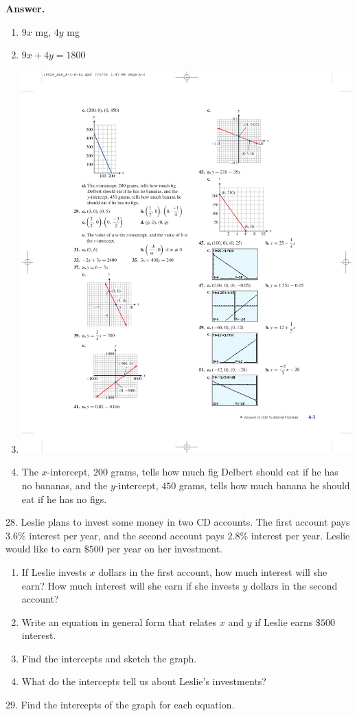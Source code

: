 \documentclass[10pt,]{book}
\theoremstyle{plain}
\theoremstyle{definition}
\theoremstyle{definition}
\theoremstyle{definition}
\numberwithin{equation}{part}
\begin{document}
\begin{exerciselist}
\par\smallskip
\noindent\textbf{Answer.}\hypertarget{answer-21}{}\quad
\leavevmode%
\begin{enumerate}[label=*\alph**]
\item\hypertarget{li-195}{}\(9x\) mg, \(4y\) mg%
\item\hypertarget{li-196}{}\(9x + 4y = 1800\)%
\item\hypertarget{li-197}{}\includegraphics[width=0.35\linewidth]{images/fig-ans-1-1-27}
%
\item\hypertarget{li-198}{}The \(x\)-intercept, \(200\) grams, tells how much fig Delbert should eat if he has no bananas, and the \(y\)-intercept, \(450\) grams, tells how much banana he should eat if he has no figs.%
\end{enumerate}
%
\item[28.]\hypertarget{exercise-35}{}Leslie plans to invest some money in two CD accounts. The first account pays \(3.6\%\) interest per year, and the second account pays \(2.8\%\) interest per year. Leslie would like to earn \(\$500\) per year on her investment.%
\leavevmode%
\begin{enumerate}[label=*\alph**]
\item\hypertarget{li-199}{}If Leslie invests \(x\) dollars in the first account, how much interest will she earn? How much interest will she earn if she invests \(y\) dollars in the second account?%
\item\hypertarget{li-200}{}Write an equation in general form that relates \(x\) and \(y\) if Leslie earns \(\$500\) interest.%
\item\hypertarget{li-201}{}Find the intercepts and sketch the graph.%
\item\hypertarget{li-202}{}What do the intercepts tell us about Leslie's investments?%
\end{enumerate}
\par\smallskip
\item[29.]\hypertarget{exercise-36}{}Find the intercepts of the graph for each equation.%

\end{exerciselist}
\end{document}
